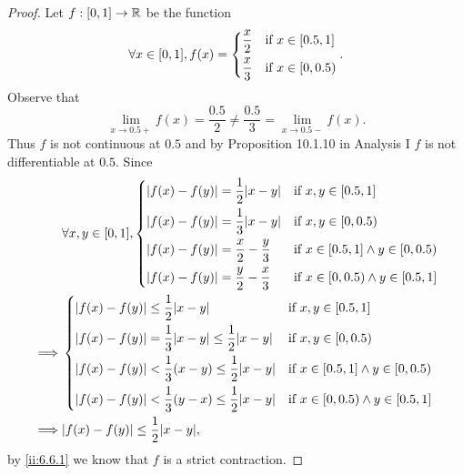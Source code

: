 \begin{proof}
  Let \(f : [0, 1] \to \mathbb{R}\) be the function
  \[
    \forall x \in [0, 1], f(x) = \begin{dcases}
      \dfrac{x}{2} & \text{if } x \in [0.5, 1] \\
      \dfrac{x}{3} & \text{if } x \in [0, 0.5)
    \end{dcases}.
  \]
  Observe that
  \[
    \lim_{x \to 0.5+} f(x) = \dfrac{0.5}{2} \neq \dfrac{0.5}{3} = \lim_{x \to 0.5-} f(x).
  \]
  Thus \(f\) is not continuous at \(0.5\) and by Proposition 10.1.10 in Analysis I \(f\) is not differentiable at \(0.5\).
  Since
  \begin{align*}
             & \forall x, y \in [0, 1], \begin{dcases}
                                          \abs{f(x) - f(y)} = \dfrac{1}{2} \abs{x - y}    & \text{if } x, y \in [0.5, 1]                   \\
                                          \abs{f(x) - f(y)} = \dfrac{1}{3} \abs{x - y}    & \text{if } x, y \in [0, 0.5)                   \\
                                          \abs{f(x) - f(y)} = \dfrac{x}{2} - \dfrac{y}{3} & \text{if } x \in [0.5, 1] \land y \in [0, 0.5) \\
                                          \abs{f(x) - f(y)} = \dfrac{y}{2} - \dfrac{x}{3} & \text{if } x \in [0, 0.5) \land y \in [0.5, 1]
                                        \end{dcases}   \\
    \implies & \begin{dcases}
                 \abs{f(x) - f(y)} \leq \dfrac{1}{2} \abs{x - y}                            & \text{if } x, y \in [0.5, 1]                   \\
                 \abs{f(x) - f(y)} = \dfrac{1}{3} \abs{x - y} \leq \dfrac{1}{2} \abs{x - y} & \text{if } x, y \in [0, 0.5)                   \\
                 \abs{f(x) - f(y)} < \dfrac{1}{3} (x - y) \leq \dfrac{1}{2} \abs{x - y}     & \text{if } x \in [0.5, 1] \land y \in [0, 0.5) \\
                 \abs{f(x) - f(y)} < \dfrac{1}{3} (y - x) \leq \dfrac{1}{2} \abs{x - y}     & \text{if } x \in [0, 0.5) \land y \in [0.5, 1]
               \end{dcases} \\
    \implies & \abs{f(x) - f(y)} \leq \dfrac{1}{2} \abs{x - y},
  \end{align*}
  by \cref{ii:6.6.1} we know that \(f\) is a strict contraction.
\end{proof}

